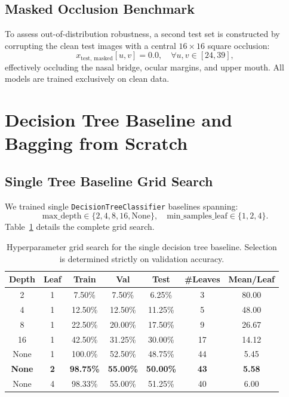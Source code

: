 \documentclass[10pt,twocolumn,letterpaper]{article}
\begin{document}
\subsection{Masked Occlusion Benchmark}
To assess out-of-distribution robustness, a second test set is constructed by corrupting the clean test images with a central $16 \times 16$ square occlusion:
\begin{equation}
    x_{\text{test, masked}}[u, v] = 0.0, \quad \forall u, v \in [24, 39],
\end{equation}
effectively occluding the nasal bridge, ocular margins, and upper mouth. All models are trained exclusively on clean data.

\section{Decision Tree Baseline and Bagging from Scratch}
\label{sec:q1}

\subsection{Single Tree Baseline Grid Search}
We trained single \texttt{DecisionTreeClassifier} baselines spanning:
\begin{equation*}
    \text{max\_depth} \in \{2, 4, 8, 16, \text{None}\}, \quad \text{min\_samples\_leaf} \in \{1, 2, 4\}.
\end{equation*}
Table~\ref{tab:q1_grid} details the complete grid search.

\begin{table}[h]
\centering
\small
\caption{Hyperparameter grid search for the single decision tree baseline. Selection is determined strictly on validation accuracy.}
\label{tab:q1_grid}
\begin{tabular}{ccccccc}
\toprule
Depth & Leaf & Train & Val & Test & \#Leaves & Mean/Leaf \\
\midrule
2 & 1 & 7.50\% & 7.50\% & 6.25\% & 3 & 80.00 \\
4 & 1 & 12.50\% & 12.50\% & 11.25\% & 5 & 48.00 \\
8 & 1 & 22.50\% & 20.00\% & 17.50\% & 9 & 26.67 \\
16 & 1 & 42.50\% & 31.25\% & 30.00\% & 17 & 14.12 \\
None & 1 & 100.0\% & 52.50\% & 48.75\% & 44 & 5.45 \\
\textbf{None} & \textbf{2} & \textbf{98.75\%} & \textbf{55.00\%} & \textbf{50.00\%} & \textbf{43} & \textbf{5.58} \\
None & 4 & 98.33\% & 55.00\% & 51.25\% & 40 & 6.00 \\
\bottomrule
\end{tabular}
\end{table}
\end{document}
